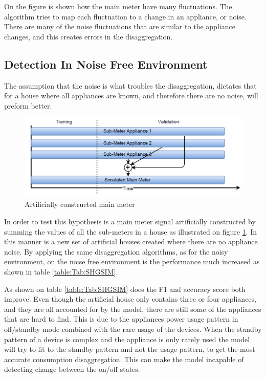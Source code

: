 On the figure is shown how the main meter have many fluctuations. The algorithm tries to map each fluctuation to a change in an appliance, or noise. There are many of the noise fluctuations that are similar to the appliance changes, and this creates errors in the disaggregation. 


\subsection{Detection In Noise Free Environment }
\label{sec:NOISEFREE}
The assumption that the noise is what troubles the disaggregation, dictates that for a house where all appliances are known, and therefore there are no noise, will preform better. 

\begin{figure}[H]
\centering
\includegraphics[width=1\textwidth]{billeder/SimIllu.png}
\caption{Artificially constructed main meter}
\label{fig:SIL}
\end{figure}

In order to test this hypothesis is a main meter signal artificially constructed by summing the values of all the sub-meters in a house as illustrated on figure \ref{fig:SIL}. In this manner is a new set of artificial houses created where there are no appliance noise. By applying the same disaggregation algorithms, as for the noisy environment, on the noise free environment is the performance much increased as shown in table \ref{table:Tab:SHGSIM}.

  

As shown on table \ref{table:Tab:SHGSIM} does the F1 and accuracy score both improve. Even though the artificial house only contains three or four appliances, and they are all accounted for by the model, there are still some of the appliances that are hard to find. This is due to the appliances power usage pattern in off/standby mode combined with the rare usage of the devices. When the standby pattern of a device is complex and the appliance is only rarely used the model will try to fit to the standby pattern and not the usage pattern, to get the most accurate consumption disaggregation. This can make the model incapable of detecting change between the on/off states.

